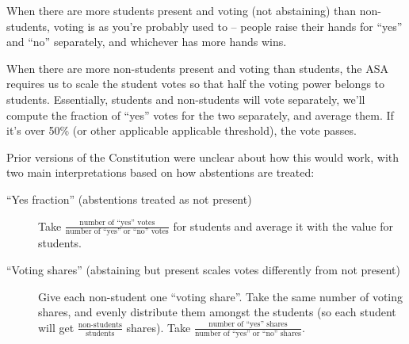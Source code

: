 \documentclass{article}
\begin{document}
When there are more students present and voting (not abstaining) than non-students, voting is as you're probably used to -- people raise their hands for ``yes'' and ``no'' separately, and whichever has more hands wins.

When there are more non-students present and voting than students, the ASA requires us to scale the student votes so that half the voting power belongs to students. Essentially, students and non-students will vote separately, we'll compute the fraction of ``yes'' votes for the two separately, and average them. If it's over 50\% (or other applicable applicable threshold), the vote passes.

Prior versions of the Constitution were unclear about how this would work, with two main interpretations based on how abstentions are treated:
\begin{description}
\item[``Yes fraction'' (abstentions treated as not present)] Take $\frac{\mbox{number of ``yes'' votes}}{\mbox{number of ``yes'' or ``no'' votes}}$ for students and average it with the value for students.
\item[``Voting shares'' (abstaining but present scales votes differently from not present)] Give each non-student one ``voting share''. Take the same number of voting shares, and evenly distribute them amongst the students (so each student will get $\frac{\mbox{non-students}}{\mbox{students}}$ shares). Take $\frac{\mbox{number of ``yes'' shares}}{\mbox{number of ``yes'' or ``no'' shares}}$.
\end{description}
\end{document}
